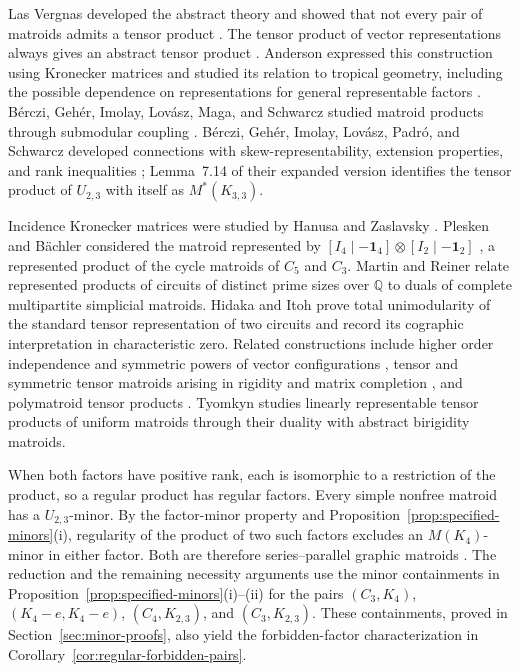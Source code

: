\documentclass[12pt,a4paper]{article}
\numberwithin{equation}{section}
\newcommand{\QQ}{\mathbb Q}
\theoremstyle{definition}
\theoremstyle{remark}
\begin{document}
Las Vergnas developed the abstract theory and showed that
not every pair of matroids admits a tensor product
\cite[Proposition~2.1]{las-vergnas-products}.  The tensor product of
vector representations always gives an abstract tensor product
\cite[p.~50]{las-vergnas-products}.  Anderson expressed this construction
using Kronecker matrices and studied its relation to tropical geometry,
including the possible dependence on representations for general
representable factors \cite[Section~2.1]{anderson-matroid-products}.
B\'erczi, Geh\'er, Imolay, Lov\'asz, Maga, and Schwarcz studied matroid
products through submodular coupling \cite{berczi-matroid-products}.
B\'erczi, Geh\'er, Imolay, Lov\'asz, Padr\'o, and Schwarcz developed
connections with skew-representability, extension properties, and
rank inequalities \cite{berczi-skew-tensor}; Lemma~7.14 of their
expanded version identifies the tensor product of \(U_{2,3}\) with
itself as \(M^*(K_{3,3})\).

Incidence Kronecker matrices were studied by Hanusa and Zaslavsky
\cite{hanusa-zaslavsky}.  Plesken and B\"achler considered the matroid
represented by
\([I_4\mid-\boldsymbol1_4]\otimes[I_2\mid-\boldsymbol1_2]\)
\cite[Example~4.13]{plesken-baechler}, a represented product of the
cycle matroids of \(C_5\) and \(C_3\).
Martin and Reiner \cite[Theorem~1 and Section~2]{martin-reiner}
relate represented products of circuits of distinct prime sizes over
\(\QQ\) to duals of complete multipartite simplicial matroids.
Hidaka and Itoh \cite[Theorem~1.2 and Section~5.2]{hidaka-itoh}
prove total unimodularity of the standard tensor representation of
two circuits and record its cographic interpretation in characteristic
zero.  Related constructions include higher order independence and symmetric
powers of vector configurations \cite{baclawski-white}, tensor and
symmetric tensor matroids arising in rigidity and matrix completion
\cite{brakensiek-rigidity,jackson-tanigawa-symmetric-tensor}, and
polymatroid tensor products \cite{padro-polymatroid-tensor}.
Tyomkyn \cite{tyomkyn-linear-products} studies linearly representable
tensor products of uniform matroids through their duality with abstract
birigidity matroids.

When both factors have positive rank, each is isomorphic to a restriction
of the product, so a regular product has regular factors.
Every simple nonfree matroid has a \(U_{2,3}\)-minor.  By the
factor-minor property and Proposition~\ref{prop:specified-minors}\textup{(i)},
regularity of the product of two such factors excludes an \(M(K_4)\)-minor
in either factor.  Both are therefore series--parallel graphic matroids
\cite{brylawski-series-parallel,bonin-long}.
The reduction and the remaining necessity arguments use the minor
containments in Proposition~\ref{prop:specified-minors}\textup{(i)--(ii)}
for the pairs \((C_3,K_4)\), \((K_4-e,K_4-e)\),
\((C_4,K_{2,3})\), and \((C_3,K_{2,3})\).
These containments, proved in Section~\ref{sec:minor-proofs}, also yield
the forbidden-factor characterization in
Corollary~\ref{cor:regular-forbidden-pairs}.
\end{document}

